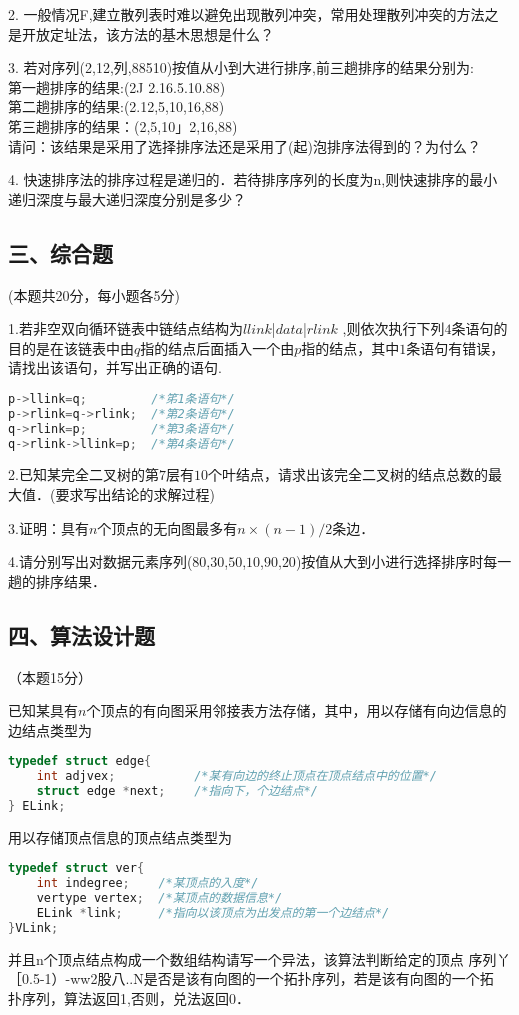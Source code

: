 2. 一般情况F,建立散列表时难以避免出现散列冲突，常用处理散列冲突的方法之 是开放定址法，该方法的基木思想是什么？

3. 若对序列(2,12,列,88510)按值从小到大进行排序,前三趟排序的结果分别为: \\
第一趟排序的结果:(2J 2.16.5.10.88) \\
第二趟排序的结果:(2.12,5,10,16,88) \\
笫三趟排序的结果：(2,5,10」2,16,88) \\
请问：该结果是采用了选择排序法还是采用了(起)泡排序法得到的？为付么？

4. 快速排序法的排序过程是递归的．若待排序序列的长度为n,则快速排序的最小 递归深度与最大递归深度分别是多少？

\subsection{三、综合题}
(本题共20分，每小题各5分)

1.若非空双向循环链表中链结点结构为$llink$|$data$|$rlink$ ,则依次执行下列$4$条语句的目的是在该链表中由$q$指的结点后面插入一个由$p$指的结点，其中$1$条语句有错误，请找出该语句，并写出正确的语句.
\begin{lstlisting}[language=cpp]
p->llink=q;         /*笫1条语句*/
p->rlink=q->rlink;  /*第2条语句*/
q->rlink=p;         /*第3条语句*/
q->rlink->llink=p;  /*第4条语句*/
\end{lstlisting}

2.已知某完全二叉树的第$7$层有$10$个叶结点，请求出该完全二叉树的结点总数的最大值．(要求写出结论的求解过程)

3.证明：具有$n$个顶点的无向图最多有$n\times(n-1)/2$条边．

4.请分别写出对数据元素序列($80$,$30$,$50$,$10$,$90$,$20$)按值从大到小进行选择排序时每一趟的排序结果．

\subsection{四、算法设计题}
（本题15分）

已知某具有$n$个顶点的有向图采用邻接表方法存储，其中，用以存储有向边信息的边结点类型为
\begin{lstlisting}[language=cpp]
typedef struct edge{
    int adjvex;           /*某有向边的终止顶点在顶点结点中的位置*/
    struct edge *next;    /*指向下，个边结点*/
} ELink;
\end{lstlisting}
用以存储顶点信息的顶点结点类型为
\begin{lstlisting}[language=cpp]
typedef struct ver{
    int indegree;    /*某顶点的入度*/
    vertype vertex;  /*某顶点的数据信息*/
    ELink *link;     /*指向以该顶点为出发点的第一个边结点*/
}VLink;
\end{lstlisting}
并且n个顶点结点构成一个数组结构请写一个异法，该算法判断给定的顶点 序列丫［0.5-1）-{ww2股八..N}是否是该有向图的一个拓扑序列，若是该有向图的一个拓 扑序列，算法返回1,否则，兑法返回0．

